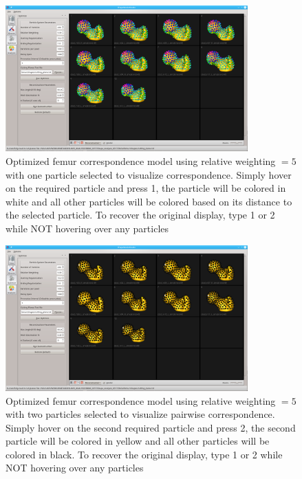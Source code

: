 \documentclass[letterpaper,12pt]{article}   %
\begin{document}
\begin{figure}[!htp]
	\centering
	\includegraphics[width=0.83\textwidth]{figs_v2/femur_optimize_reconstructed_hover1.png}
	\caption{Optimized femur correspondence model using relative weighting $ = 5$ with one particle selected to visualize correspondence. Simply hover on the required particle and press 1, the particle will be colored in white and all other particles will be colored based on its distance to the selected particle. To recover the original display, type 1 or 2 while NOT hovering over any particles}
	\label{fig:femur_optimize_reconstructed_hover1}
\end{figure}

\begin{figure}[!htp]
	\centering
	\includegraphics[width=0.83\textwidth]{figs_v2/femur_optimize_reconstructed_hover2.png}
	\caption{Optimized femur correspondence model using relative weighting $ = 5$ with two particles selected to visualize pairwise correspondence. Simply hover on the second required particle and press 2, the second particle will be colored in yellow and all other particles will be colored in black. To recover the original display, type 1 or 2 while NOT hovering over any particles}
	\label{fig:femur_optimize_reconstructed_hover2}
\end{figure}
\end{document}
